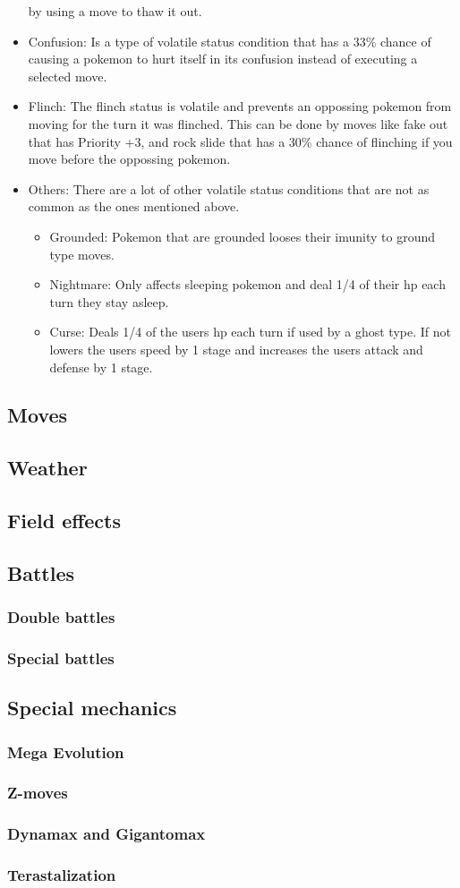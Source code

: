 \begin{itemize}
    by using a move to thaw it out.
  \item Confusion: Is a type of volatile status condition that has a 33\% chance of causing a pokemon to hurt itself in its confusion instead of executing
    a selected move.
  \item Flinch: The flinch status is volatile and prevents an oppossing pokemon from moving for the turn it was flinched. This can be done by moves like 
    fake out that has Priority +3, and rock slide that has a 30\% chance of flinching if you move before the oppossing pokemon.
  \item Others: There are a lot of other volatile status conditions that are not as common as the ones mentioned above.
  \begin{itemize}
    \item Grounded: Pokemon that are grounded looses their imunity to ground type moves.
    \item Nightmare: Only affects sleeping pokemon and deal 1/4 of their hp each turn they stay asleep.
    \item Curse: Deals 1/4 of the users hp each turn if used by a ghost type. If not lowers the users speed by 1 stage and increases 
      the users attack and defense by 1 stage.
  \end{itemize}
\end{itemize}
\subsection{Moves}
\subsection{Weather}
\subsection{Field effects}
\subsection{Battles}
\subsubsection{Double battles}
\subsubsection{Special battles}
\subsection{Special mechanics}
\subsubsection{Mega Evolution}
\subsubsection{Z-moves}
\subsubsection{Dynamax and Gigantomax}
\subsubsection{Terastalization}
